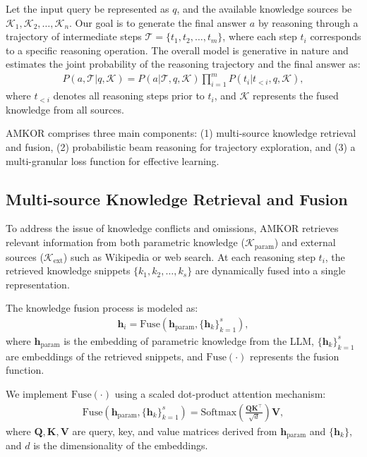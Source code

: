 Let the input query be represented as \( q \), and the available knowledge sources be \( \mathcal{K}_1, \mathcal{K}_2, \dots, \mathcal{K}_n \). Our goal is to generate the final answer \( a \) by reasoning through a trajectory of intermediate steps \( \mathcal{T} = \{t_1, t_2, \dots, t_m\} \), where each step \( t_i \) corresponds to a specific reasoning operation. The overall model is generative in nature and estimates the joint probability of the reasoning trajectory and the final answer as:
\begin{align}
P(a, \mathcal{T} | q, \mathcal{K}) = P(a | \mathcal{T}, q, \mathcal{K}) \prod_{i=1}^m P(t_i | t_{<i}, q, \mathcal{K}),
\end{align}
where \( t_{<i} \) denotes all reasoning steps prior to \( t_i \), and \( \mathcal{K} \) represents the fused knowledge from all sources.

AMKOR comprises three main components: (1) multi-source knowledge retrieval and fusion, (2) probabilistic beam reasoning for trajectory exploration, and (3) a multi-granular loss function for effective learning.

\subsection{Multi-source Knowledge Retrieval and Fusion}

To address the issue of knowledge conflicts and omissions, AMKOR retrieves relevant information from both parametric knowledge (\( \mathcal{K}_{\text{param}} \)) and external sources (\( \mathcal{K}_{\text{ext}} \)) such as Wikipedia or web search. At each reasoning step \( t_i \), the retrieved knowledge snippets \( \{k_1, k_2, \dots, k_s\} \) are dynamically fused into a single representation. 

The knowledge fusion process is modeled as:
\begin{align}
\mathbf{h}_i = \text{Fuse}(\mathbf{h}_{\text{param}}, \{\mathbf{h}_k\}_{k=1}^s),
\end{align}
where \( \mathbf{h}_{\text{param}} \) is the embedding of parametric knowledge from the LLM, \( \{\mathbf{h}_k\}_{k=1}^s \) are embeddings of the retrieved snippets, and \( \text{Fuse}(\cdot) \) represents the fusion function.

We implement \( \text{Fuse}(\cdot) \) using a scaled dot-product attention mechanism:
\begin{align}
\text{Fuse}(\mathbf{h}_{\text{param}}, \{\mathbf{h}_k\}_{k=1}^s) = \text{Softmax} \left( \frac{\mathbf{Q} \mathbf{K}^\top}{\sqrt{d}} \right) \mathbf{V},
\end{align}
where \( \mathbf{Q}, \mathbf{K}, \mathbf{V} \) are query, key, and value matrices derived from \( \mathbf{h}_{\text{param}} \) and \( \{\mathbf{h}_k\} \), and \( d \) is the dimensionality of the embeddings.

